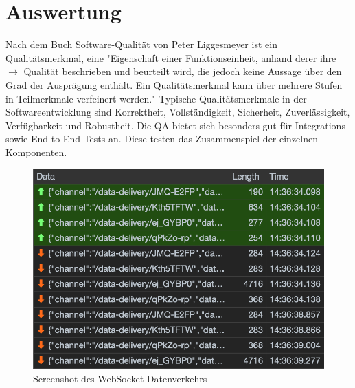 \chapter{Auswertung}
\label{chap:auswertung}

Nach dem Buch Software-Qualität von Peter Liggesmeyer
ist ein Qualitätsmerkmal, eine "Eigenschaft einer Funktionseinheit, anhand derer ihre \(\rightarrow\)
Qualität beschrieben und beurteilt wird, die jedoch keine Aussage über
den Grad der Ausprägung enthält. Ein Qualitätsmerkmal kann über mehrere Stufen in Teilmerkmale
verfeinert werden."\cite[S. 515]{SoftwareQualitaet} Typische Qualitätsmerkmale in der Softwareentwicklung
sind Korrektheit, Vollständigkeit, Sicherheit, Zuverlässigkeit, Verfügbarkeit und Robustheit.\cite[S. 5]{SoftwareQualitaet}
Die QA bietet sich besonders gut für Integrations- sowie End-to-End-Tests an. Diese testen
das Zusammenspiel der einzelnen Komponenten.



\begin{figure}
    \label{figure:screenshotdeswebsocketdatenverkehrs}
    \begin{center}
    \includegraphics[scale=0.65]{img/screenshots/WebSocketTraffic}
    \end{center}
    \caption{Screenshot des WebSocket-Datenverkehrs}
\end{figure}
